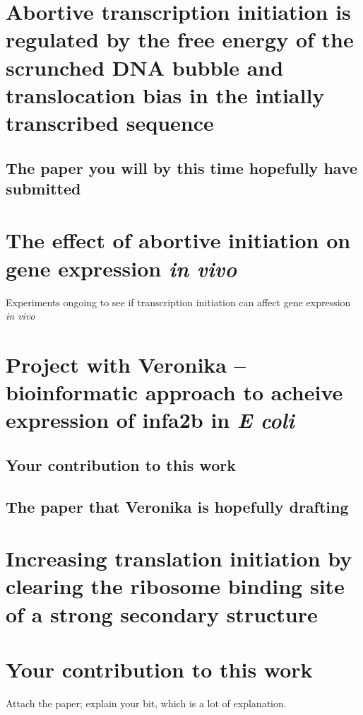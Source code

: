 \documentclass[b5paper]{report}
\begin{document}
\subsection{}

\chapter{Abortive transcription initiation is regulated by the free energy of
the scrunched DNA bubble and translocation bias in the intially transcribed
sequence}

\section{The paper you will by this time hopefully have submitted}

\chapter{The effect of abortive initiation on gene expression \textit{in vivo}}
Experiments ongoing to see if transcription initiation can affect gene
expression \textit{in vivo}

\chapter{Project with Veronika -- bioinformatic approach to acheive expression
of infa2b in \textit{E coli}}

\section{Your contribution to this work}

\section{The paper that Veronika is hopefully drafting}

\chapter{Increasing translation initiation by clearing the ribosome binding
site of a strong secondary structure}

\chapter{Your contribution to this work}
Attach the paper; explain your bit, which is a lot of explanation.
\end{document}
